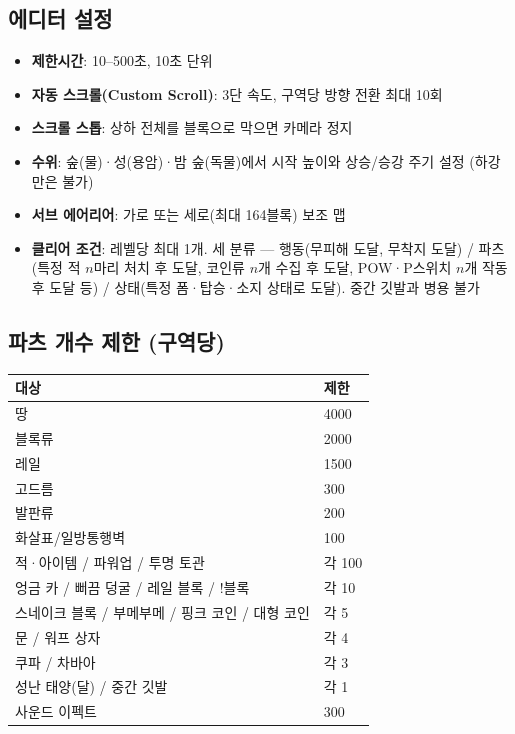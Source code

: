 \documentclass[10pt,a4paper]{article}
\begin{document}
\subsection{에디터 설정}

\begin{itemize}
  \item \textbf{제한시간}: 10--500초, 10초 단위
  \item \textbf{자동 스크롤(Custom Scroll)}: 3단 속도, 구역당 방향 전환 최대 10회
  \item \textbf{스크롤 스톱}: 상하 전체를 블록으로 막으면 카메라 정지
  \item \textbf{수위}: 숲(물)·성(용암)·밤 숲(독물)에서 시작 높이와 상승/승강 주기 설정 (하강만은 불가)
  \item \textbf{서브 에어리어}: 가로 또는 세로(최대 164블록) 보조 맵
  \item \textbf{클리어 조건}: 레벨당 최대 1개. 세 분류 --- 행동(무피해 도달, 무착지 도달) / 파츠(특정 적 $n$마리 처치 후 도달, 코인류 $n$개 수집 후 도달, POW·P스위치 $n$개 작동 후 도달 등) / 상태(특정 폼·탑승·소지 상태로 도달). 중간 깃발과 병용 불가
\end{itemize}

\subsection{파츠 개수 제한 (구역당)}

\begin{longtable}{L{6cm} L{2.5cm}}
\toprule
\textbf{대상} & \textbf{제한} \\
\midrule
땅 & 4000 \\
블록류 & 2000 \\
레일 & 1500 \\
고드름 & 300 \\
발판류 & 200 \\
화살표/일방통행벽 & 100 \\
적·아이템 / 파워업 / 투명 토관 & 각 100 \\
엉금 카 / 뻐끔 덩굴 / 레일 블록 / !블록 & 각 10 \\
스네이크 블록 / 부메부메 / 핑크 코인 / 대형 코인 & 각 5 \\
문 / 워프 상자 & 각 4 \\
쿠파 / 차바아 & 각 3 \\
성난 태양(달) / 중간 깃발 & 각 1 \\
사운드 이펙트 & 300 \\
\bottomrule
\end{longtable}
\end{document}
